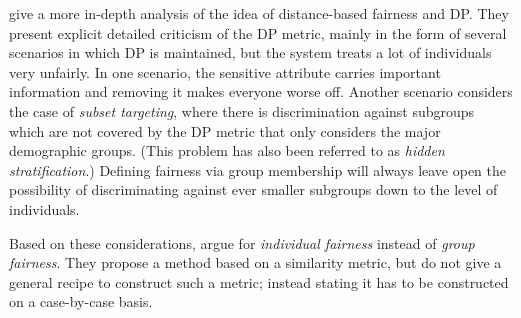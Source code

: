 \citet{dwork2012fairness} give a more in-depth analysis of the idea of distance-based fairness and
\ac{DP}. They present explicit detailed criticism of the \ac{DP} metric, mainly in the form of
several scenarios in which \ac{DP} is maintained, but the system treats a lot of individuals very
unfairly. In one scenario, the sensitive attribute carries important information and removing it
makes everyone worse off.
Another scenario considers the case of \emph{subset targeting}, where there is discrimination
against subgroups which are not covered by the \ac{DP} metric that only considers the major
demographic groups. (This problem has also been referred to as \emph{hidden stratification}.)
Defining fairness via group membership will always leave open the possibility of discriminating
against ever smaller subgroups down to the level  of individuals.

Based on these considerations, \citet{dwork2012fairness} argue for \emph{individual fairness}
instead of \emph{group fairness}. They propose a method based on a similarity metric, but do not
give a general recipe to construct such a metric; instead stating it has to be constructed on a
case-by-case basis.


